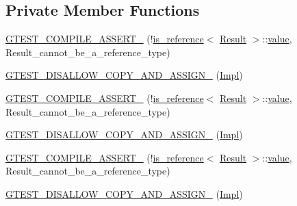 \subsection*{Private Member Functions}
\begin{DoxyCompactItemize}
\item 
\mbox{\hyperlink{classtesting_1_1internal_1_1_return_action_1_1_impl_aa78abb95d718d193f787e9235818caca}{G\+T\+E\+S\+T\+\_\+\+C\+O\+M\+P\+I\+L\+E\+\_\+\+A\+S\+S\+E\+R\+T\+\_\+}} (!\mbox{\hyperlink{structtesting_1_1internal_1_1is__reference}{is\+\_\+reference}}$<$ \mbox{\hyperlink{classtesting_1_1_action_interface_a7477de2fe3e4e01c59db698203acaee7}{Result}} $>$\+::\mbox{\hyperlink{_obj__test_2lib_2googletest-master_2googlemock_2test_2gmock-matchers__test_8cc_a337b8a670efc0b086ad3af163f3121b6}{value}}, Result\+\_\+cannot\+\_\+be\+\_\+a\+\_\+reference\+\_\+type)
\item 
\mbox{\hyperlink{classtesting_1_1internal_1_1_return_action_1_1_impl_abc88338b2f0a633f71eccacb81d03fba}{G\+T\+E\+S\+T\+\_\+\+D\+I\+S\+A\+L\+L\+O\+W\+\_\+\+C\+O\+P\+Y\+\_\+\+A\+N\+D\+\_\+\+A\+S\+S\+I\+G\+N\+\_\+}} (\mbox{\hyperlink{classtesting_1_1internal_1_1_return_action_1_1_impl}{Impl}})
\item 
\mbox{\hyperlink{classtesting_1_1internal_1_1_return_action_1_1_impl_aa78abb95d718d193f787e9235818caca}{G\+T\+E\+S\+T\+\_\+\+C\+O\+M\+P\+I\+L\+E\+\_\+\+A\+S\+S\+E\+R\+T\+\_\+}} (!\mbox{\hyperlink{structtesting_1_1internal_1_1is__reference}{is\+\_\+reference}}$<$ \mbox{\hyperlink{classtesting_1_1_action_interface_a7477de2fe3e4e01c59db698203acaee7}{Result}} $>$\+::\mbox{\hyperlink{_obj__test_2lib_2googletest-master_2googlemock_2test_2gmock-matchers__test_8cc_a337b8a670efc0b086ad3af163f3121b6}{value}}, Result\+\_\+cannot\+\_\+be\+\_\+a\+\_\+reference\+\_\+type)
\item 
\mbox{\hyperlink{classtesting_1_1internal_1_1_return_action_1_1_impl_abc88338b2f0a633f71eccacb81d03fba}{G\+T\+E\+S\+T\+\_\+\+D\+I\+S\+A\+L\+L\+O\+W\+\_\+\+C\+O\+P\+Y\+\_\+\+A\+N\+D\+\_\+\+A\+S\+S\+I\+G\+N\+\_\+}} (\mbox{\hyperlink{classtesting_1_1internal_1_1_return_action_1_1_impl}{Impl}})
\item 
\mbox{\hyperlink{classtesting_1_1internal_1_1_return_action_1_1_impl_aa78abb95d718d193f787e9235818caca}{G\+T\+E\+S\+T\+\_\+\+C\+O\+M\+P\+I\+L\+E\+\_\+\+A\+S\+S\+E\+R\+T\+\_\+}} (!\mbox{\hyperlink{structtesting_1_1internal_1_1is__reference}{is\+\_\+reference}}$<$ \mbox{\hyperlink{classtesting_1_1_action_interface_a7477de2fe3e4e01c59db698203acaee7}{Result}} $>$\+::\mbox{\hyperlink{_obj__test_2lib_2googletest-master_2googlemock_2test_2gmock-matchers__test_8cc_a337b8a670efc0b086ad3af163f3121b6}{value}}, Result\+\_\+cannot\+\_\+be\+\_\+a\+\_\+reference\+\_\+type)
\item 
\mbox{\hyperlink{classtesting_1_1internal_1_1_return_action_1_1_impl_abc88338b2f0a633f71eccacb81d03fba}{G\+T\+E\+S\+T\+\_\+\+D\+I\+S\+A\+L\+L\+O\+W\+\_\+\+C\+O\+P\+Y\+\_\+\+A\+N\+D\+\_\+\+A\+S\+S\+I\+G\+N\+\_\+}} (\mbox{\hyperlink{classtesting_1_1internal_1_1_return_action_1_1_impl}{Impl}})
\end{DoxyCompactItemize}
